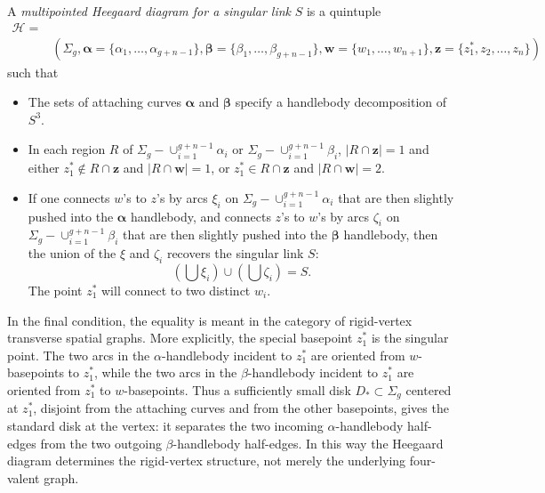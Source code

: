 \documentclass[11pt]{amsart}
\theoremstyle{definition}
\theoremstyle{remark}
\numberwithin{equation}{section}
\begin{document}
A \emph{multipointed Heegaard diagram for a singular link} $S$ is a quintuple
\begin{align*}
    \mathcal{H}=&\\&(\Sigma_g,\bm{\alpha}=\{\alpha_1,\hdots,\alpha_{g+n-1}\},\bm{\beta}=\{\beta_1,\hdots,\beta_{g+n-1}\},\bm{w}=\{w_1,\hdots,w_{n+1}\},\bm{z}=\{z_1^*,z_2,\hdots,z_{n}\})
\end{align*}
such that 
\begin{itemize}
\item The sets of attaching curves $\bm{\alpha}$ and $\bm{\beta}$ specify a handlebody decomposition of $S^3.$
\item In each region $R$ of $\Sigma_g-\cup_{i=1}^{g+n-1}\alpha_i$ or $\Sigma_g-\cup_{i=1}^{g+n-1}\beta_i$, $|
R\cap \bm{z}|=1$ and either $z_1^*\not\in R\cap\bm{z}$ and $|R\cap \bm{w}|=1$, or $z_1^*\in R\cap \bm{z}$ and $|R\cap \bm{w}|=2$.
\item If one connects $w$'s to $z$'s by arcs $\xi_i$ on $\Sigma_g-\cup_{i=1}^{g+n-1}\alpha_i$ that are then slightly pushed into the $\bm{\alpha}$ handlebody, and connects $z$'s to $w$'s by arcs $\zeta_i$ on $\Sigma_g-\cup_{i=1}^{g+n-1}\beta_i$ that are then slightly pushed into the $\bm{\beta}$ handlebody, then the union of the $\xi$ and $\zeta_i$ recovers the singular link $S$: \[(\bigcup \xi_i)\cup(\bigcup \zeta_i)=S.\] The point $z_1^*$ will connect to two distinct $w_i$.
\end{itemize}
In the final condition, the equality is meant in the category of
rigid-vertex transverse spatial graphs. More explicitly, the special
basepoint \(z_1^*\) is the singular point. The two arcs in the
\(\alpha\)-handlebody incident to \(z_1^*\) are oriented from \(w\)-basepoints
to \(z_1^*\), while the two arcs in the \(\beta\)-handlebody incident to
\(z_1^*\) are oriented from \(z_1^*\) to \(w\)-basepoints. Thus a sufficiently
small disk \(D_*\subset \Sigma_g\) centered at \(z_1^*\), disjoint from the
attaching curves and from the other basepoints, gives the standard disk at
the vertex: it separates the two incoming \(\alpha\)-handlebody half-edges
from the two outgoing \(\beta\)-handlebody half-edges. In this way the
Heegaard diagram determines the rigid-vertex structure, not merely the
underlying four-valent graph.
\end{document}
